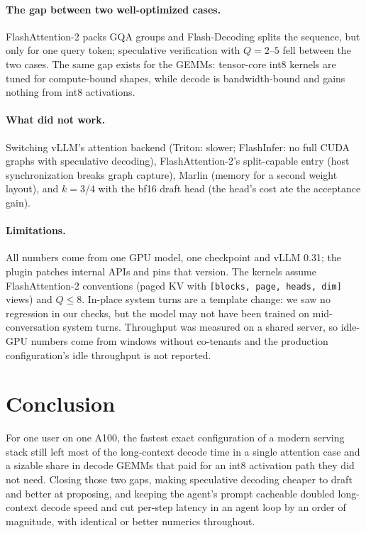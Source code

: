 \documentclass[acmtog,nonacm,screen]{acmart}
\begin{document}
\paragraph{The gap between two well-optimized cases.} FlashAttention-2 packs GQA groups and Flash-Decoding splits the
sequence, but only for one query token; speculative verification with $Q{=}2$--$5$ fell between the two cases. The
same gap exists for the GEMMs: tensor-core int8 kernels are tuned for compute-bound shapes, while decode is
bandwidth-bound and gains nothing from int8 activations.

\paragraph{What did not work.} Switching vLLM's attention backend (Triton: slower; FlashInfer: no full CUDA graphs with
speculative decoding), FlashAttention-2's split-capable  entry (host synchronization breaks graph
capture), Marlin (memory for a second weight layout), and $k{=}3$/$4$ with the bf16 draft head (the head's cost ate
the acceptance gain).

\paragraph{Limitations.} All numbers come from one GPU model, one checkpoint and vLLM 0.31; the plugin patches
internal APIs and pins that version. The kernels assume FlashAttention-2 conventions (paged KV with
\texttt{[blocks, page, heads, dim]} views) and $Q \le 8$. In-place system turns are a template change: we saw no
regression in our checks, but the model may not have been trained on mid-conversation system turns. Throughput was
measured on a shared server, so idle-GPU numbers come from windows without co-tenants and the production
configuration's idle throughput is not reported.

\section{Conclusion}
For one user on one A100, the fastest exact configuration of a modern serving stack still left most of the long-context
decode time in a single attention case and a sizable share in decode GEMMs that paid for an int8 activation path they
did not need. Closing those two gaps, making speculative decoding cheaper to draft and better at proposing, and
keeping the agent's prompt cacheable doubled long-context decode speed and cut per-step latency in an agent loop by an
order of magnitude, with identical or better numerics throughout.
\end{document}
